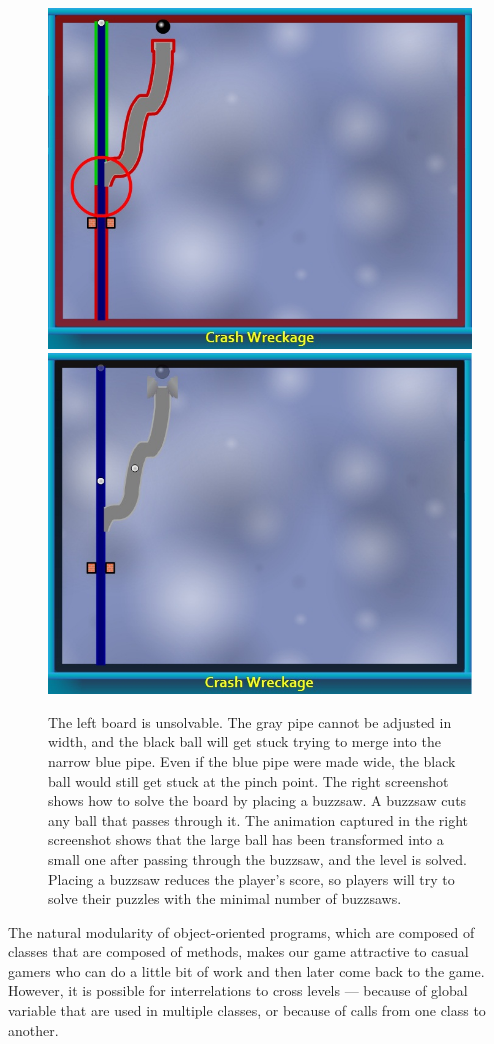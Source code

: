 \documentclass{sig-alternate}
\begin{document}
\begin{figure}
\begin{center}
\includegraphics[width=.49\textwidth]{images/unsolvable-pre-buzzsaw}%
\hfill%
\includegraphics[width=.49\textwidth]{images/unsolvable-post-buzzsaw}
\end{center}
\vspace{-10pt}
\caption{
  The left board is unsolvable.  The gray pipe cannot be adjusted in width,
  and the black ball will get stuck trying to merge into the narrow blue
  pipe.  Even if the blue pipe were made wide, the black ball would still
  get stuck at the pinch point.
  \newline
  The right screenshot shows how to solve the board by placing a buzzsaw.
  A buzzsaw cuts any ball that passes through it.  The animation captured
  in the right screenshot shows that the large ball has been transformed
  into a small one after passing through the buzzsaw, and the level is
  solved.  Placing a buzzsaw reduces the player's score, so players will
  try to solve their puzzles with the minimal number of buzzsaws.
}
\label{fig:game-buzzsaw}
\end{figure}


The natural modularity of object-oriented programs, which are composed
of classes that are composed of methods, makes our game attractive to
casual gamers who can do a little bit of work and then later come back
to the game.  However, it is possible for interrelations to cross
levels --- because of global variable that are used in multiple
classes, or because of calls from one class to another.
\end{document}
